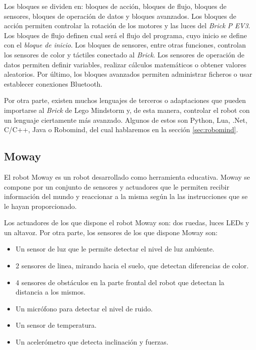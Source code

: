 Los bloques se dividen en: bloques de acción, bloques de flujo, bloques de sensores, bloques de operación de datos y bloques avanzados. 
Los bloques de acción permiten controlar la rotación de los motores y las luces del \emph{Brick P EV3}. Los bloques de flujo definen cual será el flujo del programa, cuyo inicio se define con el \emph{bloque de inicio}. Los bloques de sensores, entre otras funciones, controlan los sensores de color y táctiles conectado al \emph{Brick}. Los sensores de operación de datos permiten definir variables, realizar cálculos matemáticos o obtener valores aleatorios. Por último, los bloques avanzados permiten administrar ficheros o usar establecer conexiones Bluetooth.

Por otra parte, existen muchos lenguajes de terceros o adaptaciones que pueden importarse al \emph{Brick} de Lego Mindstorm y, de esta manera, controlar el robot con un lenguaje ciertamente más avanzado. Algunos de estos son Python, Lua, .Net, C/C++, Java o Robomind, del cual hablaremos en la sección \ref{sec:robomind}.


\subsection{Moway}
\label{sec:moway}


El robot Moway\cite{moway} es un robot desarrollado como herramienta educativa. Moway se compone por un conjunto de sensores y actuadores que le permiten recibir información del mundo y reaccionar a la misma según la las instrucciones que se le hayan proporcionado.

Los actuadores de los que dispone el robot Moway son: dos ruedas, luces LEDs y un altavoz. Por otra parte, los sensores de los que dispone Moway son: 
\begin{itemize}
	\item Un sensor de luz que le permite detectar el nivel de luz ambiente. 
	\item 2 sensores de linea, mirando hacia el suelo, que detectan diferencias de color.
	\item 4 sensores de obstáculos en la parte frontal del robot que detectan la distancia a los mismos.
	\item Un micrófono para detectar el nivel de ruido.
	\item Un sensor de temperatura. 
	\item Un acelerómetro que detecta inclinación y fuerzas.
\end{itemize}

